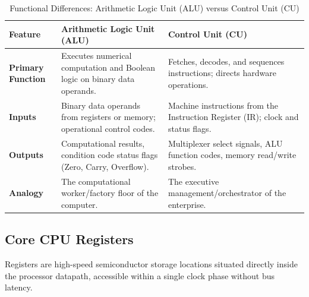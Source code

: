 \begin{table}[htbp]
\centering
\small
\caption{Functional Differences: Arithmetic Logic Unit (ALU) versus Control Unit (CU)}
\label{tab:alu_vs_cu}
\begin{tabularx}{\textwidth}{l X X}
\toprule
\textbf{Feature} & \textbf{Arithmetic Logic Unit (ALU)} & \textbf{Control Unit (CU)} \\
\midrule
\textbf{Primary Function} & Executes numerical computation and Boolean logic on binary data operands. & Fetches, decodes, and sequences instructions; directs hardware operations. \\
\textbf{Inputs} & Binary data operands from registers or memory; operational control codes. & Machine instructions from the Instruction Register (IR); clock and status flags. \\
\textbf{Outputs} & Computational results, condition code status flags (Zero, Carry, Overflow). & Multiplexer select signals, ALU function codes, memory read/write strobes. \\
\textbf{Analogy} & The computational worker/factory floor of the computer. & The executive management/orchestrator of the enterprise. \\
\bottomrule
\end{tabularx}
\end{table}

\subsection{Core CPU Registers}
Registers are high-speed semiconductor storage locations situated directly inside the processor datapath, accessible within a single clock phase without bus latency.

